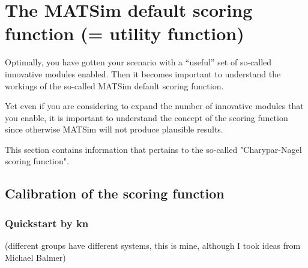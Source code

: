 \chapter{The MATSim default scoring function (= utility function)}

Optimally, you have gotten your scenario with a ``useful'' set of so-called innovative modules enabled.  
%
Then it becomes important to understand the workings of the so-called MATSim default scoring function.

Yet even if you are considering to expand the number of innovative modules that you enable, it is important to understand the concept of the scoring function since otherwise MATSim will not produce plausible results.

This section contains information that pertains to the so-called "Charypar-Nagel scoring function".

\vfill\eject
\section{Calibration of the scoring function}

\subsection{Quickstart by kn}

(different groups have different systems, this is mine, although I took ideas from Michael Balmer)

